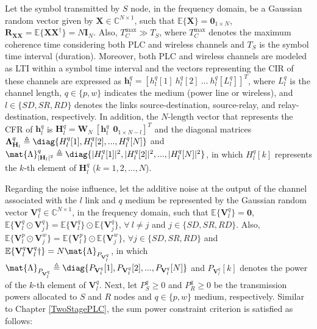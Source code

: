 Let the symbol transmitted by $S$ node, in the frequency domain, be a Gaussian random vector given by $\mathbf{X} \in \mathbb{C}^{N \times 1}$, such that $ \mathbb{E}\{\mathbf{X}\} = \mathbf{0}_{1\times N}  $, $ \mathbf{R}_{\mathbf{X}\mathbf{X}} = \mathbb{E}\{\mathbf{X}\mathbf{X}^\dagger\} = N \mathbf{I}_{N} $. Also, $ T_{C}^{\max} \gg T_{S} $, where $ T_{C}^{\max} $ denotes the maximum coherence time considering both \ac{PLC} and wireless channels and $ T_{S} $ is the symbol time interval (duration). Moreover, both \ac{PLC} and wireless channels are modeled as \ac{LTI} within a symbol time interval and the vectors representing the \ac{CIR} of these channels are expressed as $ \mathbf{h}_{l}^q = [h_{l}^q[1]\ h_{l}^q[2]\ ...\ h_{l}^q[L_{l}^q]]^T $, where $ L_{l}^q $ is the channel length, $ q \in \{p,w\} $ indicates the medium (power line or wireless), and $ l \in \{SD,SR,RD\}$ denotes the links source-destination, source-relay, and relay-destination, respectively. In addition, the $ N\text{-length} $ vector that represents the \ac{CFR} of $ \mathbf{h}_{l}^q $ is $ \mathbf{H}_{l}^q = \mathbf{W}_{N} \  [\mathbf{h}_{l}^q\ \  \mathbf{0}_{1\times N - l}]^T $ and the diagonal matrices $ \mathbf{\Lambda}_{\mathbf{H}_{l}}^q \triangleq \diag \{H_{l}^q[1], H_{l}^q[2],...,H_{l}^q[N]\} $ and $ \mat{\Lambda}_{|\mathbf{H}_{l}|^2}^q \triangleq \diag \{|H_{l}^q[1]|^2, |H_{l}^q[2]|^2,...,|H_{l}^q[N]|^2\} $, in which $ H_{l}^q[k] $ represents the $k$-th element of $ \mathbf{H}_{l}^q $ ($ k = 1,2,...,N $).

Regarding the noise influence, let the additive noise at the output of the channel associated with the $l$ link and $q$ medium be represented by the Gaussian random vector $ \mathbf{V}_{l}^q \in \mathbb{C}^{N \times 1}$, in the frequency domain, such that $ \mathbb{E}\{\mathbf{V}_{l}^q\} = \mathbf{0} $, $ \mathbb{E}\{\mathbf{V}_{l}^q \odot\mathbf{V}_{j}^q \} = \mathbb{E}\{\mathbf{V}_{l}^q\} \odot \mathbb{E}\{\mathbf{V}_{j}^q\} $, $ \forall \  l \neq j $ and $j \in \{SD,SR,RD\}$. Also, $ \mathbb{E}\{\mathbf{V}_{l}^p \odot\mathbf{V}_{j}^w \} = \mathbb{E}\{\mathbf{V}_{l}^p\} \odot \mathbb{E}\{\mathbf{V}_{j}^w\} $, $ \forall j \in \{SD,SR,RD\} $ and $ \mathbb{E}\{\mathbf{V}_{l}^q\mathbf{V}_{l}^q\dagger\} = N \mat{\Lambda}_{P_{\mathbf{V}_{l}^q}}$, in which  $\mat{\Lambda}_{P_{\mathbf{V}_{l}^q}} \triangleq \diag\{P_{\mathbf{V}_{l}^q}[1],P_{\mathbf{V}_{l}^q}[2],...,P_{\mathbf{V}_{l}^q}[N]\} $ and $ P_{\mathbf{V}_{l}^q}[k] $ denotes the power of the $k$-th element of $\mathbf{V}_{l}^q$. Next, let $ P_{S}^q \geq 0 $ and $ P_{R}^q \geq 0  $ be the transmission powers allocated to $S$ and $R$ nodes and $q \in \{p,w\}$ medium, respectively. Similar to Chapter \ref{TwoStagePLC}, the sum power constraint criterion is satisfied as follows:

